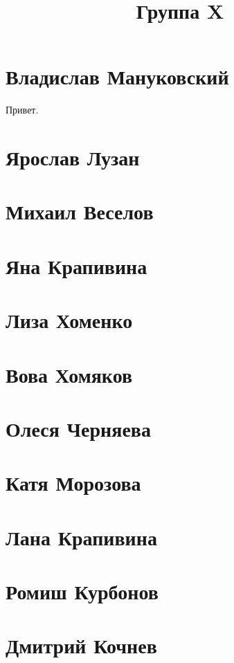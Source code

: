 \documentclass{article}
\title{Группа X}
\begin{document}
\section*{Владислав Мануковский}
Привет.
\section*{Ярослав Лузан}

\section*{Михаил Веселов}

\section*{Яна Крапивина}

\section*{Лиза Хоменко}

\section*{Вова Хомяков}

\section*{Олеся Черняева}

\section*{Катя Морозова}


\section*{Лана Крапивина}

\section*{Ромиш Курбонов}

\section*{Дмитрий Кочнев}
\end{document}
